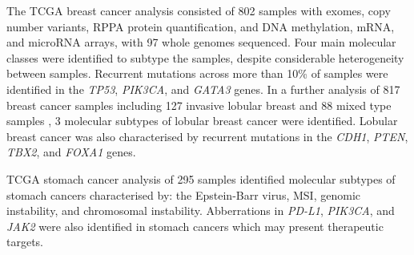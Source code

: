 The \gls{TCGA} breast cancer analysis \citep{TCGA2012} consisted of 802 samples with exomes, copy number variants, RPPA protein quantification, and \acrshort{DNA} methylation, \acrshort{mRNA}, and \gls{microRNA} arrays, with 97 whole \glspl{genome} sequenced. Four main molecular classes were identified to subtype the samples, despite considerable heterogeneity between samples. Recurrent \glspl{mutation} across more than 10\% of samples were identified in the \textit{TP53}, \textit{PIK3CA}, and \textit{GATA3} genes. %
In a further analysis of 817 breast cancer samples including 127 invasive lobular breast and 88 mixed type samples \citep{TCGA2015LBC}, 3 \glspl{molecular subtype} of lobular breast cancer were identified. Lobular breast cancer was also characterised by \glspl{recurrent mutation} in the \textit{CDH1}, \textit{PTEN}, \textit{TBX2}, and \textit{FOXA1} genes.


\gls{TCGA} stomach cancer analysis of 295 samples \citep{TCGA2014GC} identified \glspl{molecular subtype} of stomach cancers characterised by: the Epstein-Barr virus, \gls{MSI}, genomic instability, and chromosomal instability. Abberrations in  \textit{PD-L1}, \textit{PIK3CA}, and \textit{JAK2} were also identified in stomach cancers which may present therapeutic targets.


